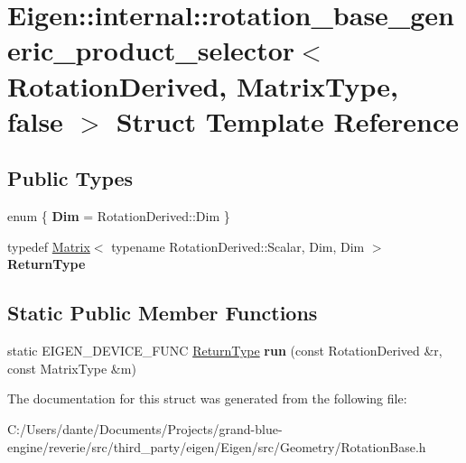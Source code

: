 \hypertarget{struct_eigen_1_1internal_1_1rotation__base__generic__product__selector_3_01_rotation_derived_00_01_matrix_type_00_01false_01_4}{}\section{Eigen\+::internal\+::rotation\+\_\+base\+\_\+generic\+\_\+product\+\_\+selector$<$ Rotation\+Derived, Matrix\+Type, false $>$ Struct Template Reference}
\label{struct_eigen_1_1internal_1_1rotation__base__generic__product__selector_3_01_rotation_derived_00_01_matrix_type_00_01false_01_4}
\subsection*{Public Types}
\begin{DoxyCompactItemize}
\item 
\mbox{\label{struct_eigen_1_1internal_1_1rotation__base__generic__product__selector_3_01_rotation_derived_00_01_matrix_type_00_01false_01_4_aabbadfb540ca1f092ce526601d40c60e}} 
enum \{ {\bfseries Dim} = Rotation\+Derived\+::Dim
 \}
\item 
\mbox{\label{struct_eigen_1_1internal_1_1rotation__base__generic__product__selector_3_01_rotation_derived_00_01_matrix_type_00_01false_01_4_a34ec3b1c3773e68c3f8a6c05519aa43a}} 
typedef \mbox{\hyperlink{class_eigen_1_1_matrix}{Matrix}}$<$ typename Rotation\+Derived\+::\+Scalar, Dim, Dim $>$ {\bfseries Return\+Type}
\end{DoxyCompactItemize}
\subsection*{Static Public Member Functions}
\begin{DoxyCompactItemize}
\item 
\mbox{\label{struct_eigen_1_1internal_1_1rotation__base__generic__product__selector_3_01_rotation_derived_00_01_matrix_type_00_01false_01_4_a4b6de128f1557d57efdaef40aaee06b7}} 
static E\+I\+G\+E\+N\+\_\+\+D\+E\+V\+I\+C\+E\+\_\+\+F\+U\+NC \mbox{\hyperlink{class_eigen_1_1_matrix}{Return\+Type}} {\bfseries run} (const Rotation\+Derived \&r, const Matrix\+Type \&m)
\end{DoxyCompactItemize}


The documentation for this struct was generated from the following file\+:\begin{DoxyCompactItemize}
\item 
C\+:/\+Users/dante/\+Documents/\+Projects/grand-\/blue-\/engine/reverie/src/third\+\_\+party/eigen/\+Eigen/src/\+Geometry/Rotation\+Base.\+h\end{DoxyCompactItemize}
